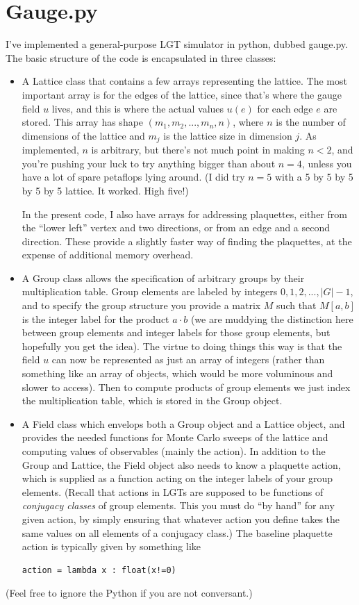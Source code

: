 \documentclass[9pt,twocolumn,twoside]{article}
\begin{document}
\section{Gauge.py}
I've implemented a general-purpose LGT simulator in python, dubbed gauge.py.  The basic structure of the code is encapsulated in three classes: 
\begin{itemize}
\item A Lattice class that contains a few arrays representing the lattice.  The most important array is for the edges of the lattice, since that's where the gauge field $u$ lives, and this is where the actual values $u(e)$ for each edge $e$ are stored.  This array has shape $(m_1,m_2,...,m_n,n)$, where $n$ is the number of dimensions of the lattice and $m_j$ is the lattice size in dimension $j$.  As implemented, $n$ is arbitrary, but there's not much point in making $n<2$, and you're pushing your luck to try anything bigger than about $n=4$, unless you have a lot of spare petaflops lying around.  (I did try $n=5$ with a 5 by 5 by 5 by 5 by 5 lattice.  It worked.  High five!) 

In the present code, I also have arrays for addressing plaquettes, either from the ``lower left'' vertex and two directions, or from an edge and a second direction.  These provide a slightly faster way of finding the plaquettes, at the expense of additional memory overhead. 
\item A Group class allows the specification of arbitrary groups by their multiplication table.  Group elements are labeled by integers $0,1,2,...,|G|-1$, and to specify the group structure you provide a matrix $M$ such that $M[a,b]$ is the integer label for the product $a\cdot b$ (we are muddying the distinction here between group elements and integer labels for those group elements, but hopefully you get the idea).  The virtue to doing things this way is that the field $u$ can now be represented as just an array of integers (rather than something like an array of objects, which would be more voluminous and slower to access).  Then to compute products of group elements we just index the multiplication table, which is stored in the Group object. 
\item A Field class which envelops both a Group object and a Lattice object, and provides the needed functions for Monte Carlo sweeps of the lattice and computing values of observables (mainly the action).  In addition to the Group and Lattice, the Field object also needs to know a plaquette action, which is supplied as a function acting on the integer labels of your group elements.  (Recall that actions in LGTs are supposed to be functions of \textit{conjugacy classes} of group elements.  This you must do ``by hand'' for any given action, by simply ensuring that whatever action you define takes the same values on all elements of a conjugacy class.)  The baseline plaquette action is typically given by something like 
\begin{lstlisting}
action = lambda x : float(x!=0)
\end{lstlisting}
\end{itemize}
(Feel free to ignore the Python if you are not conversant.)
\end{document}
